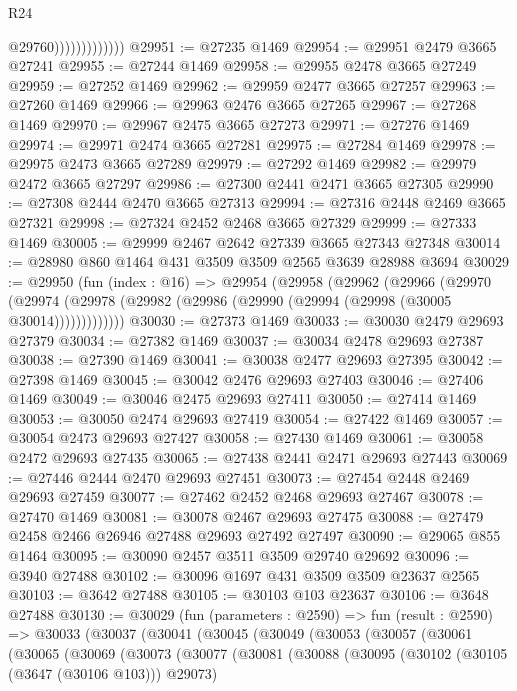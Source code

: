 \begin{lexlean}{R24}
\begin{coremodule}
                              @29760)))))))))))))
@29951 := @27235 @1469
@29954 := @29951 @2479 @3665 @27241
@29955 := @27244 @1469
@29958 := @29955 @2478 @3665 @27249
@29959 := @27252 @1469
@29962 := @29959 @2477 @3665 @27257
@29963 := @27260 @1469
@29966 := @29963 @2476 @3665 @27265
@29967 := @27268 @1469
@29970 := @29967 @2475 @3665 @27273
@29971 := @27276 @1469
@29974 := @29971 @2474 @3665 @27281
@29975 := @27284 @1469
@29978 := @29975 @2473 @3665 @27289
@29979 := @27292 @1469
@29982 := @29979 @2472 @3665 @27297
@29986 := @27300 @2441 @2471 @3665 @27305
@29990 := @27308 @2444 @2470 @3665 @27313
@29994 := @27316 @2448 @2469 @3665 @27321
@29998 := @27324 @2452 @2468 @3665 @27329
@29999 := @27333 @1469
@30005 := @29999 @2467 @2642 @27339 @3665 @27343 @27348
@30014 := @28980 @860 @1464 @431 @3509 @3509 @2565 @3639 @28988 @3694
@30029 := @29950
    (fun (index : @16) =>
    @29954
      (@29958
        (@29962
          (@29966
            (@29970
              (@29974 (@29978 (@29982 (@29986 (@29990 (@29994 (@29998 (@30005 @30014)))))))))))))
@30030 := @27373 @1469
@30033 := @30030 @2479 @29693 @27379
@30034 := @27382 @1469
@30037 := @30034 @2478 @29693 @27387
@30038 := @27390 @1469
@30041 := @30038 @2477 @29693 @27395
@30042 := @27398 @1469
@30045 := @30042 @2476 @29693 @27403
@30046 := @27406 @1469
@30049 := @30046 @2475 @29693 @27411
@30050 := @27414 @1469
@30053 := @30050 @2474 @29693 @27419
@30054 := @27422 @1469
@30057 := @30054 @2473 @29693 @27427
@30058 := @27430 @1469
@30061 := @30058 @2472 @29693 @27435
@30065 := @27438 @2441 @2471 @29693 @27443
@30069 := @27446 @2444 @2470 @29693 @27451
@30073 := @27454 @2448 @2469 @29693 @27459
@30077 := @27462 @2452 @2468 @29693 @27467
@30078 := @27470 @1469
@30081 := @30078 @2467 @29693 @27475
@30088 := @27479 @2458 @2466 @26946 @27488 @29693 @27492 @27497
@30090 := @29065 @855 @1464
@30095 := @30090 @2457 @3511 @3509 @29740 @29692
@30096 := @3940 @27488
@30102 := @30096 @1697 @431 @3509 @3509 @23637 @2565
@30103 := @3642 @27488
@30105 := @30103 @103 @23637
@30106 := @3648 @27488
@30130 := @30029
    (fun (parameters : @2590) =>
    fun (result : @2590) =>
    @30033
      (@30037
        (@30041
          (@30045
            (@30049
              (@30053
                (@30057
                  (@30061
                    (@30065
                      (@30069
                        (@30073
                          (@30077
                            (@30081
                              (@30088
                                (@30095
                                  (@30102 (@30105 (@3647 (@30106 @103))) @29073)

\end{coremodule}
\end{lexlean}

